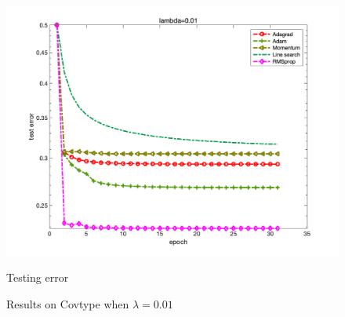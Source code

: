 \documentclass{article}
\begin{document}
\begin{figure}[H]
\begin{minipage}{0.33\linewidth}
		\includegraphics[width=1\linewidth]{./fig/err_c4}
		\caption{Testing error}
	\end{minipage}
	\caption*{Results on Covtype when $\lambda=0.01$}
\end{figure}
\end{document}
